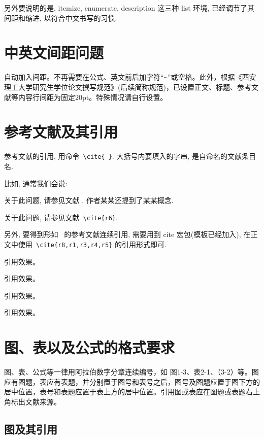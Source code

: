 另外要说明的是, itemize, enumerate, description 这三种 list 环境, 已经调节了其间距和缩进\cite{yukai,Ngiam2011Multimodal}, 
以符合中文书写的习惯\cite{方军雄2007所有制}.

\section{中英文间距问题}

自动加入间距。不再需要在公式、英文前后加字符``\verb|~|''或空格。此外，根据《西安理工大学研究生学位论文撰写规范》\cite{r6-1}(后续简称规范)，已设置正文、标题、参考文献等内容行间距为固定20pt。特殊情况请自行设置。

\section{参考文献及其引用}

参考文献的引用, 用命令~\verb|\cite{ }|. 大括号内要填入的字串, 是自命名的文献条目名.

比如, 通常我们会说:

{
关于此问题, 请参见文献 \cite{r2,r10,r11,r22}. 作者某某还提到了某某概念\cite{r1}.}

{
关于此问题, 请参见文献~\verb|\cite{r6}|.
}


另外, 要得到形如~\cite{r8,r1,r3,r4,r5} 的参考文献连续引用, 需要用到 cite 宏包(模板已经加入),
在正文中使用~\verb|\cite{r8,r1,r3,r4,r5}| 的引用形式即可.

引用效果\cite{r1,r3,r4,r5}。

引用效果\cite{Alejandro2020Automatic,Han2020Full,Hung2020Automated,Hyun2020Defect,Ritu2020Prevalence,Sankaranarayanan2020Gradient,Sukhdeep2020A,Yukiko2020Robust,Yi2020Intensity,Weiguo2020A,Sukhdeep2020A,Sankaranarayanan2020Gradient,Ritu2020Prevalence}。

引用效果\cite{r6,r7}。

引用效果\cite{r9}。

\section{图、表以及公式的格式要求}

图、表、公式等一律用阿拉伯数字分章连续编号，如 图1-3、表2-1、（3-2）等。图应有图题，表应有表题，并分别置于图号和表号之后，图号及图题应置于图下方的居中位置，表号和表题应置于表上方的居中位置。引用图或表应在图题或表题右上角标出文献来源。

\subsection{图及其引用}

